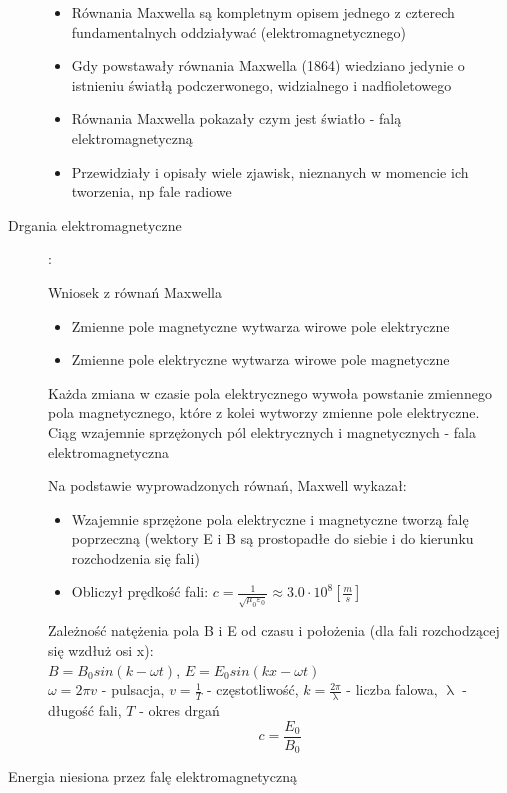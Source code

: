 \documentclass[a4paper,11pt]{article}
\begin{document}
\begin{description}
\begin{itemize}
  \item Równania Maxwella są kompletnym opisem jednego z czterech fundamentalnych oddziaływać (elektromagnetycznego)
  \item Gdy powstawały równania Maxwella (1864) wiedziano jedynie o istnieniu światłą podczerwonego, widzialnego i nadfioletowego
  \item Równania Maxwella pokazały czym jest światło - falą elektromagnetyczną
  \item Przewidziały i opisały wiele zjawisk, nieznanych w momencie ich tworzenia, np fale radiowe
  \end{itemize}
\item[Drgania elektromagnetyczne] :

  Wniosek z równań Maxwella
  \begin{itemize}
  \item Zmienne pole magnetyczne wytwarza wirowe pole elektryczne
  \item Zmienne pole elektryczne wytwarza wirowe pole magnetyczne
  \end{itemize}
  Każda zmiana w czasie pola elektrycznego wywoła powstanie zmiennego pola magnetycznego, które z kolei wytworzy zmienne pole elektryczne.\\
  Ciąg wzajemnie sprzężonych pól elektrycznych i magnetycznych - fala elektromagnetyczna

  Na podstawie wyprowadzonych równań, Maxwell wykazał:
  \begin{itemize}
  \item Wzajemnie sprzężone pola elektryczne i magnetyczne tworzą falę poprzeczną (wektory E i B są prostopadłe do siebie i do kierunku rozchodzenia się fali)
  \item Obliczył prędkość fali: $c=\frac{1}{\sqrt{\mu_0\varepsilon_0}}\approx 3.0\cdot10^8 \left[\frac{m}{s}\right]$
  \end{itemize}
  Zależność natężenia pola B i E od czasu i położenia (dla fali rozchodzącej się wzdłuż osi x):\\
  $B=B_0sin(k-\omega t)$, $E=E_0sin(kx-\omega t)$\\
  $\omega = 2\pi v$ - pulsacja, $v = \frac{1}{T}$ - częstotliwość, $k=\frac{2\pi}{\uplambda}$ - liczba falowa, $\uplambda$ - długość fali, $T$ - okres drgań
  $$c = \frac{E_0}{B_0}$$
\item[Energia niesiona przez falę elektromagnetyczną] 



\end{description}
\end{document}
